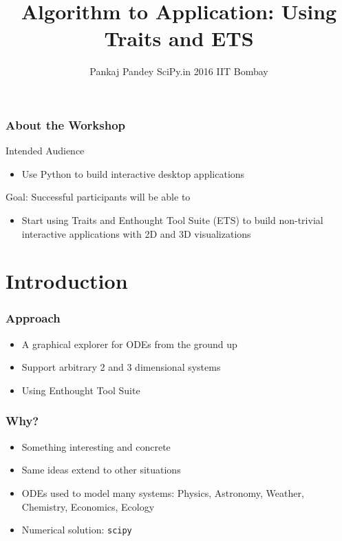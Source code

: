 \documentclass[14pt,compress]{beamer}
\title[Traits]{Algorithm to Application: \newline Using Traits and ETS}
\author[Pankaj] {Pankaj Pandey \newline SciPy.in 2016 \newline IIT Bombay}
\institute[] {\large \pgfimage[height=3em]{enthought-logo_lg}
}
\date[] {
\small
}
\newcommand{\typ}[1]{\lstinline{#1}}
\begin{document}
\begin{frame}
  \maketitle
\end{frame}


\begin{frame}
  \frametitle{About the Workshop}
  \begin{block}{Intended Audience}
  \begin{itemize}
    \item Use Python to build interactive desktop applications
  \end{itemize}
  \end{block}

  \begin{block}{Goal: Successful participants will be able to}
    \begin{itemize}
      \item Start using Traits and Enthought Tool Suite (ETS) to build
		    non-trivial interactive applications with 2D and 3D visualizations

    \end{itemize}
  \end{block}
\end{frame}

\section{Introduction}

\begin{frame}
  \frametitle{}
  \begin{center}
  \end{center}
\end{frame}

\begin{frame}
  \frametitle{Approach}
  \begin{itemize}
      \item A graphical explorer for ODEs from the ground up
  \item Support arbitrary 2 and 3 dimensional systems
  \item Using Enthought Tool Suite
 \end{itemize}
\end{frame}

\begin{frame}
  \frametitle{Why?}
  \begin{itemize}
  \item Something interesting and concrete
  \item Same ideas extend to other situations
  \item ODEs used to model many systems: Physics, Astronomy, Weather, Chemistry, Economics, Ecology
  \item Numerical solution: \typ{scipy}
 \end{itemize}
\end{frame}
\end{document}
